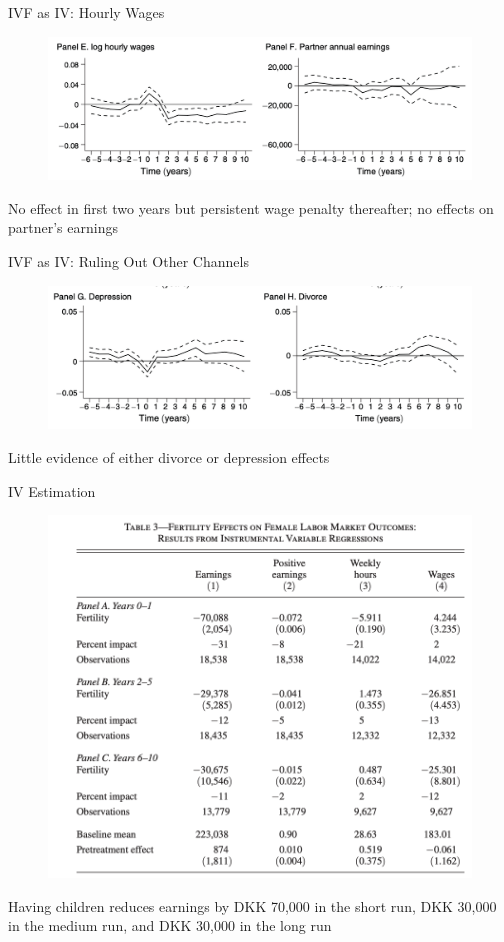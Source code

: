 \documentclass[11pt,notes=hide,aspectratio=169,mathserif]{beamer}
\begin{document}
\begin{frame}{IVF as IV: Hourly Wages}
\begin{figure}
\centering
\includegraphics[width=1.0\linewidth]{inputs/ivf7.png}
\end{figure}
No effect in first two years but persistent wage penalty thereafter; no effects on partner's earnings
\end{frame}

\begin{frame}{IVF as IV: Ruling Out Other Channels}
\begin{figure}
\centering
\includegraphics[width=1.0\linewidth]{inputs/ivf8.png}
\end{figure}
Little evidence of either divorce or depression effects
\end{frame}

\begin{frame}{IV Estimation}
\begin{figure}
\centering
\includegraphics[width=0.5\linewidth]{inputs/ivf9.png}
\end{figure}
Having children reduces earnings by DKK 70,000 in the short run, DKK 30,000 in the medium run, and DKK 30,000 in the long run
\end{frame}
\end{document}
